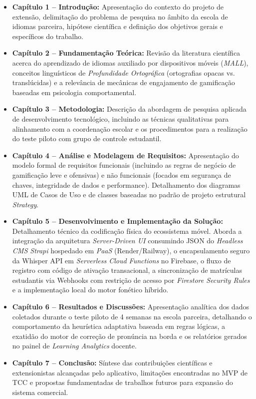 \documentclass[portuguese]{sbcreviews-2025}%
\begin{document}
\begin{itemize}
    \item \textbf{Capítulo 1 – Introdução:} Apresentação do contexto do projeto de extensão, delimitação do problema de pesquisa no âmbito da escola de idiomas parceira, hipótese científica e definição dos objetivos gerais e específicos do trabalho.
    \item \textbf{Capítulo 2 – Fundamentação Teórica:} Revisão da literatura científica acerca do aprendizado de idiomas auxiliado por dispositivos móveis (\textit{MALL}), conceitos linguísticos de \textit{Profundidade Ortográfica} (ortografias opacas vs. translúcidas) e a relevância de mecânicas de engajamento de gamificação baseadas em psicologia comportamental.
    \item \textbf{Capítulo 3 – Metodologia:} Descrição da abordagem de pesquisa aplicada de desenvolvimento tecnológico, incluindo as técnicas qualitativas para alinhamento com a coordenação escolar e os procedimentos para a realização do teste piloto com grupo de controle estudantil.
    \item \textbf{Capítulo 4 – Análise e Modelagem de Requisitos:} Apresentação do modelo formal de requisitos funcionais (incluindo as regras de negócio de gamificação leve e ofensivas) e não funcionais (focados em segurança de chaves, integridade de dados e performance). Detalhamento dos diagramas UML de Casos de Uso e de classes baseadas no padrão de projeto estrutural \textit{Strategy}.
    \item \textbf{Capítulo 5 – Desenvolvimento e Implementação da Solução:} Detalhamento técnico da codificação física do ecossistema móvel. Aborda a integração da arquitetura \textit{Server-Driven UI} consumindo JSON do \textit{Headless CMS Strapi} hospedado em \textit{PaaS} (Render/Railway), o encapsulamento seguro da Whisper API em \textit{Serverless Cloud Functions} no Firebase, o fluxo de registro com código de ativação transacional, a sincronização de matrículas estudantis via Webhooks com restrição de acesso por \textit{Firestore Security Rules} e a implementação local do motor fonético híbrido.
    \item \textbf{Capítulo 6 – Resultados e Discussões:} Apresentação analítica dos dados coletados durante o teste piloto de 4 semanas na escola parceira, detalhando o comportamento da heurística adaptativa baseada em regras lógicas, a exatidão do motor de correção de pronúncia na borda e os relatórios gerados no painel de \textit{Learning Analytics} docente.
    \item \textbf{Capítulo 7 – Conclusão:} Síntese das contribuições científicas e extensionistas alcançadas pelo aplicativo, limitações encontradas no MVP de TCC e propostas fundamentadas de trabalhos futuros para expansão do sistema comercial.
\end{itemize}
\end{document}
